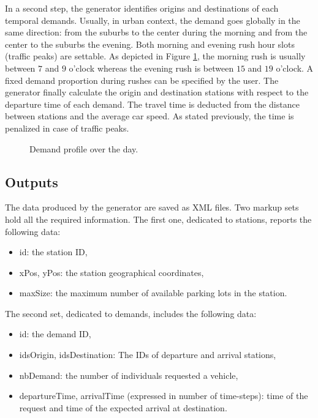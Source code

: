 \begin{bibunit}[ieeetr]
\medskip
In a second step, the generator identifies origins and destinations of each temporal demands.
Usually, in urban context, the demand goes globally in the same direction: from the suburbs to the center during the morning and from the center to the suburbs the evening.
Both morning and evening rush hour slots (traffic peaks) are settable.
As depicted in Figure \ref{fig:plotDemandProfile}, the morning rush is usually between $7$ and $9$ o'clock whereas the evening rush is between $15$ and $19$ o'clock.
A fixed demand proportion during rushes can be specified by the user.
The generator finally calculate the origin and destination stations with respect to the departure time of each demand.
The travel time is deducted from the distance between stations and the average car speed.
As stated previously, the time is penalized in case of traffic peaks.


\begin{figure}[t]
\centering

\caption{Demand profile over the day.}
\label{fig:plotDemandProfile}
\end{figure}


\subsection{Outputs}

The data produced by the generator are saved as XML files.
Two markup sets hold all the required information.
The first one, dedicated to stations, reports the following data:
\begin{itemize}
\item id: the station ID,
\item xPos, yPos: the station geographical coordinates,
\item maxSize: the maximum number of available parking lots in the station.
\end{itemize}
The second set, dedicated to demands, includes the following data: 
\begin{itemize}
\item id: the demand ID,
\item idsOrigin, idsDestination: The IDs of departure and arrival stations,
\item nbDemand: the number of individuals requested a vehicle,
\item departureTime, arrivalTime (expressed in number of time-steps): time of the request and time of the expected arrival at destination.
\end{itemize}


\end{bibunit}
